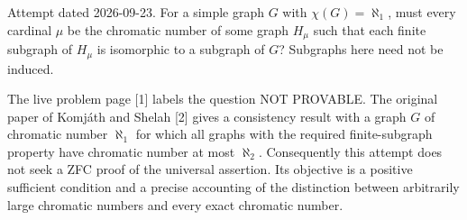 Attempt dated 2026-09-23. For a simple graph $G$ with $\chi(G)=\aleph_1$, must every cardinal $\mu$ be the chromatic number of some graph $H_\mu$ such that each finite subgraph of $H_\mu$ is isomorphic to a subgraph of $G$? Subgraphs here need not be induced.

The live problem page [1] labels the question NOT PROVABLE. The original paper of Komj\'ath and Shelah [2] gives a consistency result with a graph $G$ of chromatic number $\aleph_1$ for which all graphs with the required finite-subgraph property have chromatic number at most $\aleph_2$. Consequently this attempt does not seek a ZFC proof of the universal assertion. Its objective is a positive sufficient condition and a precise accounting of the distinction between arbitrarily large chromatic numbers and every exact chromatic number.
